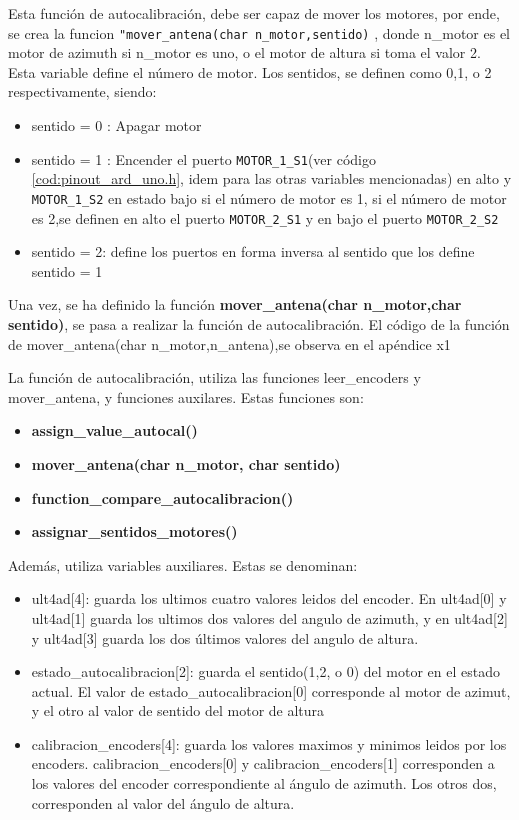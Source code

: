 Esta función de autocalibración, debe ser capaz de mover los motores, por ende, se crea la funcion \texttt{"mover_antena(char n_motor,sentido)} , donde n\_motor es el motor de azimuth si n\_motor es uno, o el motor de altura si toma el valor 2. Esta variable define el número de motor. Los sentidos, se definen  como 0,1, o 2 respectivamente, siendo: 
\begin{itemize}
	\item sentido = 0 :  Apagar motor 
	\item sentido = 1 :  Encender el puerto  \texttt{MOTOR_1_S1}(ver código \ref{cod:pinout_ard_uno.h}, idem para las otras variables mencionadas) en alto y \texttt{MOTOR_1_S2} en estado bajo si el número de motor es 1, si el número de motor es 2,se definen en alto el puerto  \texttt{MOTOR_2_S1} y en bajo el puerto 
	\texttt{MOTOR_2_S2} 
	\item sentido = 2: define los puertos en forma inversa al sentido que los define sentido = 1 
\end{itemize}
 
Una vez, se ha definido la función \textbf{mover\_antena(char n\_motor,char sentido)}, se pasa a realizar la función de autocalibración.  El código de la función de mover\_antena(char n\_motor,n\_antena),se observa en el apéndice x1  

La función de autocalibración, utiliza las funciones leer\_encoders y mover\_antena, y funciones auxilares. Estas funciones son: 

\begin{itemize}
	\item \textbf{assign\_value\_autocal()}  
	\item \textbf{mover\_antena(char n\_motor, char sentido)}   
	\item \textbf{function\_compare\_autocalibracion()}  
	\item \textbf{assignar\_sentidos\_motores()}
\end{itemize}

Además, utiliza variables auxiliares. Estas se denominan: 
\begin{itemize}
	\item ult4ad[4]: guarda los ultimos cuatro valores leidos del encoder. En ult4ad[0] y ult4ad[1] guarda los ultimos dos valores del angulo de azimuth, y en ult4ad[2] y ult4ad[3] guarda los dos últimos valores del angulo de altura. 
	\item estado\_autocalibracion[2]: guarda el sentido(1,2, o 0) del motor en el estado actual. El valor de estado\_autocalibracion[0] corresponde al motor de azimut, y el otro al valor de sentido del motor de altura 
	\item calibracion\_encoders[4]: guarda los valores maximos y minimos leidos por los encoders. calibracion\_encoders[0] y calibracion\_encoders[1] corresponden a los valores del encoder correspondiente al ángulo de azimuth. Los otros dos, corresponden al valor del ángulo de altura.   
\end{itemize}


